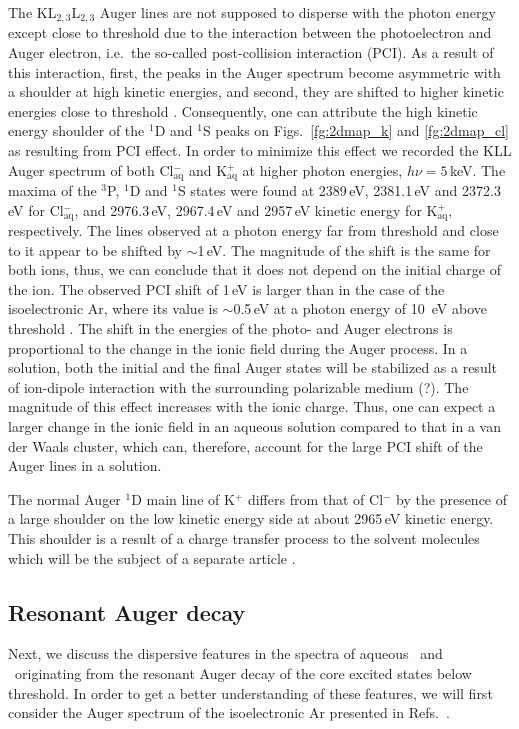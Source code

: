 The KL$_{2,3}$L$_{2,3}$ Auger lines are not supposed to disperse with the photon energy except close to threshold due to the interaction between the photoelectron and Auger electron, i.e.\ the so-called post-collision interaction (PCI). As a result of this interaction, first, the peaks in the Auger spectrum become asymmetric with a shoulder at high kinetic energies, and second, they are shifted to higher kinetic energies close to threshold \citep{russek86:911,guillemin15:012503}. Consequently, one can attribute the high kinetic energy shoulder of the $^1$D and $^1$S peaks on Figs.\ \ref{fg:2dmap_k} and \ref{fg:2dmap_cl} as resulting from PCI effect. In order to minimize this effect we recorded the KLL Auger spectrum of both Cl$^{-}_{\text{aq}}$ and K$^{+}_{\text{aq}}$ at higher photon energies, $h\nu = 5$\,keV. The maxima of the $^3$P, $^1$D and $^1$S states were found at 2389\,eV, 2381.1\,eV and 2372.3\,eV for Cl$^{-}_{\text{aq}}$, and 2976.3\,eV, 2967.4\,eV and 2957\,eV kinetic energy for K$^{+}_{\text{aq}}$, respectively. The lines observed at a photon energy far from threshold and close to it appear to be shifted by $\sim$1\,eV. The magnitude of the shift is the same for both ions, thus, we can conclude that it does not depend on the initial charge of the ion. The observed PCI shift of 1\,eV is larger than in the case of the isoelectronic Ar, where its value is $\sim$0.5\,eV at a photon energy of 10 \,eV above threshold \citep{guillemin15:012503}. The shift in the energies of the photo- and Auger electrons is proportional to the change in the ionic field during the Auger process. In a solution, both the initial and the final Auger states will be stabilized as a result {\color{red}of ion-dipole interaction with the surrounding polarizable medium (?)}. The magnitude of this effect increases with the ionic charge. Thus, one can expect a larger change in the ionic field in an aqueous solution compared to that in a van der Waals cluster, which can, therefore, account for the large PCI shift of the Auger lines in a solution.


The normal Auger $^1$D main line of K$^{+}$ differs from that of Cl$^{-}$ by the presence of a large shoulder on the low kinetic energy side at about 2965\,eV kinetic energy. This shoulder is a result of a charge transfer process to the solvent molecules which will be the subject of a separate article \citep{ceolin17}.


\subsection{Resonant Auger decay} \label{ssec:ra}
Next, we discuss the dispersive features in the spectra of aqueous \ki~and \cli~originating from the resonant Auger decay of the core excited states below threshold. In order to get a better understanding of these features, we will first consider the Auger spectrum of the isoelectronic Ar presented in Refs.\ \citep{ceolin15:022502,guillemin15:012503}. 


